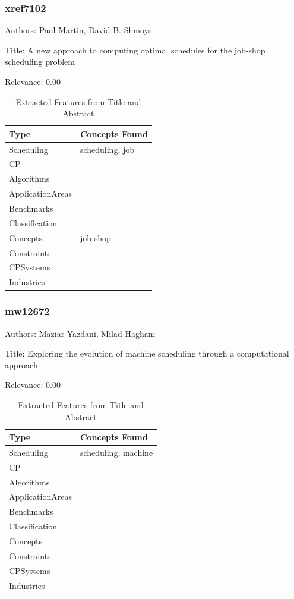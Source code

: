 \subsubsection{xref7102}
\label{mw:xref7102}

Authors: Paul Martin, David B. Shmoys

Title: A new approach to computing optimal schedules for the job-shop scheduling problem

Relevance:  0.00

{\scriptsize
\begin{longtable}{p{2cm}p{20cm}}
\caption{Extracted Features from Title and Abstract}\\ \toprule
Type & Concepts Found\\ \midrule
\endhead
\bottomrule
\endfoot
Scheduling & scheduling, job\\ 
CP & \\ 
Algorithms & \\ 
ApplicationAreas & \\ 
Benchmarks & \\ 
Classification & \\ 
Concepts & job-shop\\ 
Constraints & \\ 
CPSystems & \\ 
Industries & \\ 
\end{longtable}
}



\subsubsection{mw12672}
\label{mw:mw12672}

Authors: Maziar Yazdani, Milad Haghani

Title: Exploring the evolution of machine scheduling through a computational approach

Relevance:  0.00

{\scriptsize
\begin{longtable}{p{2cm}p{20cm}}
\caption{Extracted Features from Title and Abstract}\\ \toprule
Type & Concepts Found\\ \midrule
\endhead
\bottomrule
\endfoot
Scheduling & scheduling, machine\\ 
CP & \\ 
Algorithms & \\ 
ApplicationAreas & \\ 
Benchmarks & \\ 
Classification & \\ 
Concepts & \\ 
Constraints & \\ 
CPSystems & \\ 
Industries & \\ 
\end{longtable}
}



